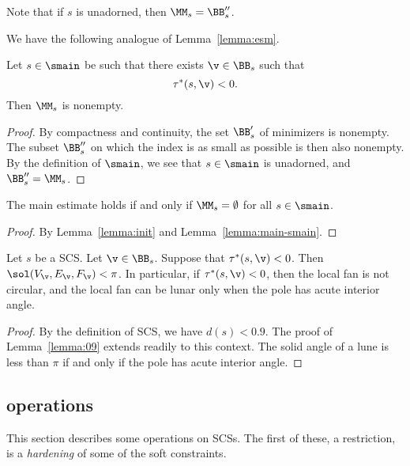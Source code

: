 Note that if $s$ is unadorned, then $\MM_s = \BB''_s$.


We have the following analogue of Lemma~\ref{lemma:esm}.

\begin{lemma}\label{lemma:init}
Let $s\in \smain$ be such that
there exists $\v\in \BB_s$ such that
\[
\tau^*(s,\v)< 0.
\]
Then $\MM_s$ is nonempty.
\end{lemma}

\begin{proof}    By compactness and continuity, the set 
$\BB'_s$ of minimizers is nonempty.   
The subset $\BB''_s$ on which the index is as small as possible
is then also nonempty.  By the definition of $\smain$,  we see that $s\in \smain$ is unadorned, and
  $\BB''_s = \MM_s$.
\end{proof}


\begin{lemma}  The main estimate holds if and only if $\MM_s=\emptyset$ for all $s\in\smain$.
\end{lemma}

\begin{proof} By Lemma~\ref{lemma:init} and Lemma~\ref{lemma:main-smain}.
\end{proof}

\begin{lemma}\label{lemma:not-circular}
Let $s$ be a SCS.  Let $\v\in \BB_s$.
Suppose that $\tau^*(s,\v)< 0$.  Then
$\sol(V_\v,E_\v,F_\v) < \pi$.
In particular, if 
$\tau^*(s,\v)<0$, then the local fan is not circular, and
the local fan can be lunar only when the pole has acute interior
angle.
\end{lemma}

\begin{proof} By the definition of SCS,
we have $d(s)< 0.9$. The proof of Lemma~\ref{lemma:09} extends readily
to this context. The solid angle of a lune is less than $\pi$ if and only
if the pole has acute interior angle.
\end{proof}





\subsection{operations}

This section describes some operations on SCSs.  
The first of these, a restriction,
 is a {\it hardening} of some of the soft constraints.


